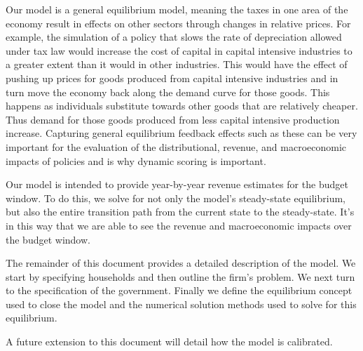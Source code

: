 \documentclass[12pt]{report}
\theoremstyle{definition}
\begin{document}
Our model is a general equilibrium model, meaning the taxes in one area of the economy result in effects on other sectors through changes in relative prices.  For example, the simulation of a policy that slows the rate of depreciation allowed under tax law would increase the cost of capital in capital intensive industries to a greater extent than it would in other industries.  This would have the effect of pushing up prices for goods produced from capital intensive industries and in turn move the economy back along the demand curve for those goods.  This happens as individuals substitute towards other goods that are relatively cheaper.  Thus demand for those goods produced from less capital intensive production increase.  Capturing general equilibrium feedback effects such as these can be very important for the evaluation of the distributional, revenue, and macroeconomic impacts of policies and is why dynamic scoring is important.  

Our model is intended to provide year-by-year revenue estimates for the budget window.  To do this, we solve for not only the model's steady-state equilibrium, but also the entire transition path from the current state to the steady-state.  It's in this way that we are able to see the revenue and macroeconomic impacts over the budget window.

The remainder of this document provides a detailed description of the model.  We start by specifying households and then outline the firm's problem.  We next turn to the specification of the government.  Finally we define the equilibrium concept used to close the model and the numerical solution methods used to solve for this equilibrium.

A future extension to this document will detail how the model is calibrated.


\end{document}
